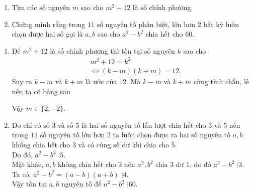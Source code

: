 \begin{ex}%
    \hfill
    \begin{enumerate}
        \item Tìm các số nguyên $m$ sao cho $m^2+12$ là số chính phương.
        \item Chứng minh rằng trong $11$ số nguyên tố phân biệt, lớn hơn $2$ bất  kỳ luôn chọn được hai số gọi là $a, b$ sao cho $a^2-b^2$ chia hết cho $60$.
    \end{enumerate}
\loigiai
    {
    \begin{enumerate}
        \item Để $m^2+12$ là số chính phương thì tồn tại số nguyên $k$ sao cho
\[ \begin{aligned}
&m^2+12=k^2\\ 
& \Leftrightarrow (k-m)(k+m)=12.
\end{aligned}
\]
Suy ra $k-m$ và $k+m$ là ước của $12$. Mà $k-m$ và $k+m$ cùng tính chẵn, lẻ nên ta có bảng sau
\begin{center}
\end{center}
Vậy $m \in \{2; -2\}$.
        \item Do chỉ có số $3$ và số $5$ là hai số nguyên tố lần lượt chia hết cho 3 và 5 nên trong $11$ số nguyên tố lớn hơn 2 ta luôn chọn được ra hai số nguyên tố $a,b$ không chia hết cho 3 và có cùng số dư khi chia cho 5. \\
Do đó, $a^2 -b^2 \,\, \vdots 5$.\\
Mặt khác, $a,b$ không chia hết cho 3 nên $a^2, b^2$ chia 3 dư 1, do đó $a^2-b^2 \,\, \vdots 3$.\\
Ta có, $a^2-b^2=(a-b)(a+b)\,\, \vdots 4$.\\
Vậy tồn tại $a, b$ nguyên tố để $a^2 -b^2\,\, \vdots 60$.
    \end{enumerate}
    }
\end{ex}

